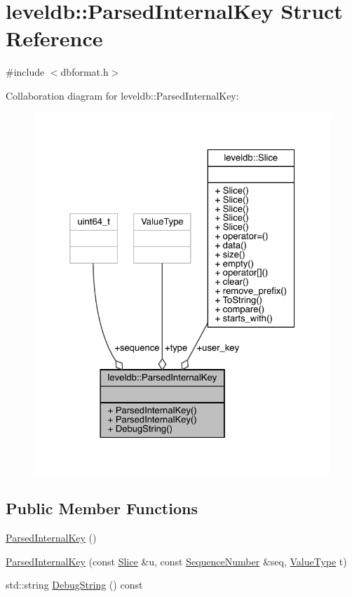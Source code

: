 \hypertarget{structleveldb_1_1_parsed_internal_key}{}\section{leveldb\+::Parsed\+Internal\+Key Struct Reference}
\label{structleveldb_1_1_parsed_internal_key}


{\ttfamily \#include $<$dbformat.\+h$>$}



Collaboration diagram for leveldb\+::Parsed\+Internal\+Key\+:
\nopagebreak
\begin{figure}[H]
\begin{center}
\leavevmode
\includegraphics[width=325pt]{structleveldb_1_1_parsed_internal_key__coll__graph}
\end{center}
\end{figure}
\subsection*{Public Member Functions}
\begin{DoxyCompactItemize}
\item 
\mbox{\hyperlink{structleveldb_1_1_parsed_internal_key_a23885ae8c8ccb36e01cdb3469ea21d67}{Parsed\+Internal\+Key}} ()
\item 
\mbox{\hyperlink{structleveldb_1_1_parsed_internal_key_acc24f6ddeb4223d0484613076a48a9a1}{Parsed\+Internal\+Key}} (const \mbox{\hyperlink{classleveldb_1_1_slice}{Slice}} \&u, const \mbox{\hyperlink{namespaceleveldb_a5481ededd221c36d652c371249f869fa}{Sequence\+Number}} \&seq, \mbox{\hyperlink{namespaceleveldb_acc038cb0d608414730cafa459a4ba866}{Value\+Type}} t)
\item 
std\+::string \mbox{\hyperlink{structleveldb_1_1_parsed_internal_key_a5371a83d503751e8ea7cc23fa16c8bfd}{Debug\+String}} () const
\end{DoxyCompactItemize}
